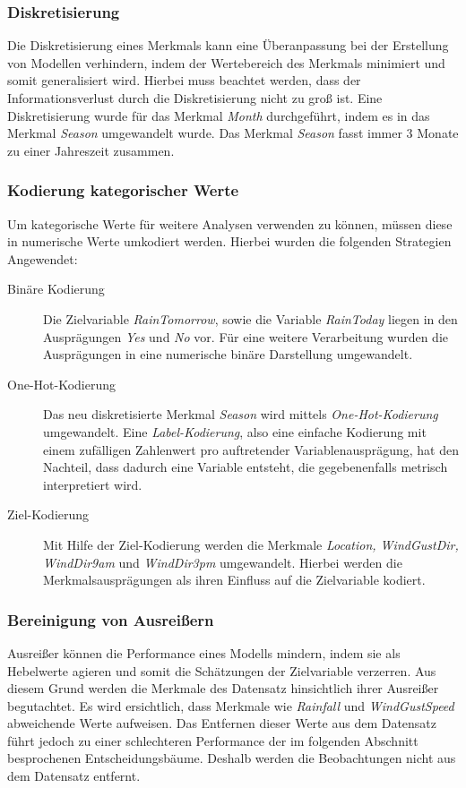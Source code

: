 \subsubsection{Diskretisierung}
Die Diskretisierung eines Merkmals kann eine Überanpassung bei der Erstellung von Modellen verhindern, indem der Wertebereich des Merkmals minimiert und somit generalisiert wird. Hierbei muss beachtet werden, dass der Informationsverlust durch die Diskretisierung nicht zu groß ist. Eine Diskretisierung wurde für das Merkmal \emph{Month} durchgeführt, indem es in das Merkmal \emph{Season} umgewandelt wurde. Das Merkmal \emph{Season} fasst immer 3 Monate zu einer Jahreszeit zusammen.

\subsubsection{Kodierung kategorischer Werte}
Um kategorische Werte für weitere Analysen verwenden zu können, müssen diese in numerische Werte umkodiert werden. Hierbei wurden die folgenden Strategien Angewendet:
\begin{description}
	\item[Binäre Kodierung]
	Die Zielvariable \emph{RainTomorrow}, sowie die Variable \emph{RainToday} liegen in den Ausprägungen \emph{Yes} und \emph{No} vor. Für eine weitere Verarbeitung wurden die Ausprägungen in eine numerische binäre Darstellung umgewandelt.
	\item[One-Hot-Kodierung]
	Das neu diskretisierte Merkmal \emph{Season} wird mittels \emph{One-Hot-Kodierung} umgewandelt. Eine \emph{Label-Kodierung}, also eine einfache Kodierung mit einem zufälligen Zahlenwert pro auftretender Variablenausprägung, hat den Nachteil, dass dadurch eine Variable entsteht, die gegebenenfalls metrisch interpretiert wird.
	\item[Ziel-Kodierung]
	Mit Hilfe der Ziel-Kodierung werden die Merkmale \emph{Location, WindGustDir, WindDir9am} und \emph{WindDir3pm} umgewandelt. Hierbei werden die Merkmalsausprägungen als ihren Einfluss auf die Zielvariable kodiert.
\end{description}

\subsubsection{Bereinigung von Ausreißern}
Ausreißer können die Performance eines Modells mindern, indem sie als Hebelwerte agieren und somit die Schätzungen der Zielvariable verzerren. Aus diesem Grund werden die Merkmale des Datensatz hinsichtlich ihrer Ausreißer begutachtet. Es wird ersichtlich, dass Merkmale wie \emph{Rainfall} und \emph{WindGustSpeed} abweichende Werte aufweisen. Das Entfernen dieser Werte aus dem Datensatz führt jedoch zu einer schlechteren Performance der im folgenden Abschnitt besprochenen Entscheidungsbäume. Deshalb werden die Beobachtungen nicht aus dem Datensatz entfernt.

